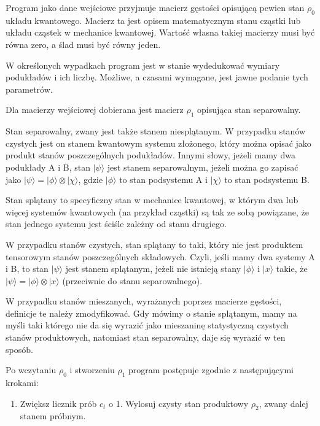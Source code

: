 \documentclass[11pt, a4paper]{article}
\begin{document}
\begin{sloppypar}
    Program jako dane wejściowe przyjmuje macierz gęstości opisującą pewien stan $\rho_{0}$
    układu kwantowego. Macierz ta jest opisem matematycznym stanu cząstki lub układu
    cząstek w mechanice kwantowej. Wartość własna takiej macierzy musi być równa zero, a
    ślad musi być równy jeden.

    W określonych wypadkach program jest w stanie wydedukować wymiary podukładów i ich
    liczbę. Możliwe, a czasami wymagane, jest jawne podanie tych parametrów.

    Dla macierzy wejściowej dobierana jest macierz $\rho_{1}$ opisująca stan separowalny.

    Stan separowalny, zwany jest także stanem niesplątanym. W przypadku stanów czystych jest
    on stanem kwantowym systemu złożonego, który można opisać jako produkt stanów
    poszczególnych podukładów. Innymi słowy, jeżeli mamy dwa podukłady A i B, stan $|\psi
    \rangle$ jest stanem separowalnym, jeżeli można go zapisać jako
    $|\psi\rangle = |\phi\rangle \otimes |\chi\rangle$, gdzie $| \phi\rangle$ to stan podsystemu
    A i $|\chi\rangle$ to stan podsystemu B.

    Stan splątany to specyficzny stan w mechanice kwantowej, w którym dwa lub więcej
    systemów kwantowych (na przykład cząstki) są tak ze sobą powiązane, że stan jednego systemu
    jest ściśle zależny od stanu drugiego.

    W przypadku stanów czystych, stan splątany to taki, który nie jest produktem tensorowym
    stanów poszczególnych składowych. Czyli, jeśli mamy dwa systemy A i B, to stan
    $|\psi\rangle$ jest stanem splątanym, jeżeli nie istnieją stany $|\phi\rangle$ i $|x\rangle$
    takie, że $|\psi\rangle = |\phi\rangle \otimes |x\rangle$ (przeciwnie do stanu separowalnego).

    W przypadku stanów mieszanych, wyrażanych poprzez macierze gęstości, definicje te
    należy zmodyfikować. Gdy mówimy o stanie splątanym, mamy na myśli taki którego nie
    da się wyrazić jako mieszaninę statystyczną czystych stanów produktowych, natomiast stan
    separowalny, daje się wyrazić w ten sposób.

    Po wczytaniu $\rho_{0}$ i stworzeniu $\rho_{1}$ program postępuje zgodnie z
    następującymi krokami:

    \begin{enumerate}
      \item Zwiększ licznik prób $c_{t}$ o 1. Wylosuj czysty stan produktowy $\rho_{2}$,
        zwany dalej stanem próbnym.


\end{enumerate}
\end{sloppypar}
\end{document}
